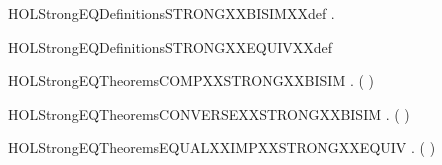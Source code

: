 \newcommand{\HOLStrongEQDate}{03 Settembre 2019}
\newcommand{\HOLStrongEQTime}{13:27}
\begin{SaveVerbatim}{HOLStrongEQDefinitionsSTRONGXXBISIMXXdef}
\HOLTokenTurnstile{} \HOLSymConst{\HOLTokenForall{}}.   \HOLSymConst{\HOLTokenEquiv{}}   
\end{SaveVerbatim}
\newcommand{\HOLStrongEQDefinitionsSTRONGXXBISIMXXdef}{\UseVerbatim{HOLStrongEQDefinitionsSTRONGXXBISIMXXdef}}
\begin{SaveVerbatim}{HOLStrongEQDefinitionsSTRONGXXEQUIVXXdef}
\HOLTokenTurnstile{}  \HOLSymConst{=}  
\end{SaveVerbatim}
\newcommand{\HOLStrongEQDefinitionsSTRONGXXEQUIVXXdef}{\UseVerbatim{HOLStrongEQDefinitionsSTRONGXXEQUIVXXdef}}
\newcommand{\HOLStrongEQDefinitions}{
\HOLDfnTag{StrongEQ}{STRONG_BISIM_def}\HOLStrongEQDefinitionsSTRONGXXBISIMXXdef
\HOLDfnTag{StrongEQ}{STRONG_EQUIV_def}\HOLStrongEQDefinitionsSTRONGXXEQUIVXXdef
}
\begin{SaveVerbatim}{HOLStrongEQTheoremsCOMPXXSTRONGXXBISIM}
\HOLTokenTurnstile{} \HOLSymConst{\HOLTokenForall{}} .
         \HOLSymConst{\HOLTokenConj{}}   \HOLSymConst{\HOLTokenImp{}}
        (  )
\end{SaveVerbatim}
\newcommand{\HOLStrongEQTheoremsCOMPXXSTRONGXXBISIM}{\UseVerbatim{HOLStrongEQTheoremsCOMPXXSTRONGXXBISIM}}
\begin{SaveVerbatim}{HOLStrongEQTheoremsCONVERSEXXSTRONGXXBISIM}
\HOLTokenTurnstile{} \HOLSymConst{\HOLTokenForall{}}.   \HOLSymConst{\HOLTokenImp{}}  ( )
\end{SaveVerbatim}
\newcommand{\HOLStrongEQTheoremsCONVERSEXXSTRONGXXBISIM}{\UseVerbatim{HOLStrongEQTheoremsCONVERSEXXSTRONGXXBISIM}}
\begin{SaveVerbatim}{HOLStrongEQTheoremsEQUALXXIMPXXSTRONGXXEQUIV}
\HOLTokenTurnstile{} \HOLSymConst{\HOLTokenForall{}} . ( \HOLSymConst{=} ) \HOLSymConst{\HOLTokenImp{}}   
\end{SaveVerbatim}
